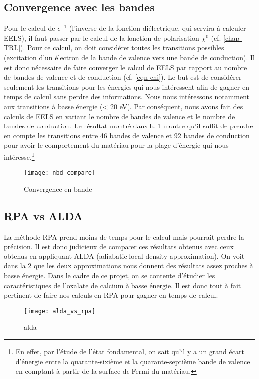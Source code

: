 \subsection{Convergence avec les bandes}
Pour le calcul de $\epsilon^{-1}$ (l'inverse de la fonction diélectrique, qui servira à calculer EELS),
il faut passer par le calcul de la fonction de polarisation $\chi^0$ (cf. \cref{chap-TRL}).
Pour ce calcul, on doit considérer toutes les transitions possibles
(excitation d'un électron de la bande de valence vers une bande de conduction).
Il est donc nécessaire de faire converger le calcul de EELS par rapport au nombre de bandes de valence
et de conduction (cf. \cref{eqn-chi}).
Le but est de considérer seulement les transitions pour les énergies qui nous intéressent
afin de gagner en temps de calcul sans perdre des informations.
Nous nous intéressons notamment aux transitions à basse énergie (< 20 eV).
Par conséquent, nous avons fait des calculs de EELS en variant le nombre de bandes de valence et le nombre de bandes de conduction.
Le résultat montré dans la \cref{fig-cv_nbd} montre qu'il suffit de prendre en compte
les transitions entre 46 bandes de valence et 92 bandes de conduction
pour avoir le comportement du matériau pour la plage d'énergie qui nous intéresse.\footnote{En
effet, par l'étude de l'état fondamental, on sait qu'il y a un grand écart d'énergie
entre la quarante-sixième et la quarante-septième bande de valence en comptant
à partir de la surface de Fermi du matériau.}
\begin{figure}[!h]
    \centering
    \texttt{[image: nbd\_compare]}
    \caption{Convergence en bande}\label{fig-cv_nbd}
\end{figure}

\subsection{RPA vs ALDA}
La méthode RPA prend moins de temps
pour le calcul mais pourrait perdre la précision.
Il est donc judicieux de comparer ces résultats obtenus avec ceux obtenus
en appliquant ALDA (adiabatic local density approximation).
On voit dans la \cref{fig-alda_vs_rpa} que
les deux approximations nous donnent des résultats assez proches à basse énergie.
Dans le cadre de ce projet, on se contente d'étudier les caractéristiques
de l'oxalate de calcium à basse énergie.
Il est donc tout à fait pertinent de faire nos calculs en RPA pour gagner en temps de calcul.
\begin{figure}[!h]
    \centering
    \texttt{[image: alda\_vs\_rpa]}
    \caption{alda}\label{fig-alda_vs_rpa}
\end{figure}
\clearpage

